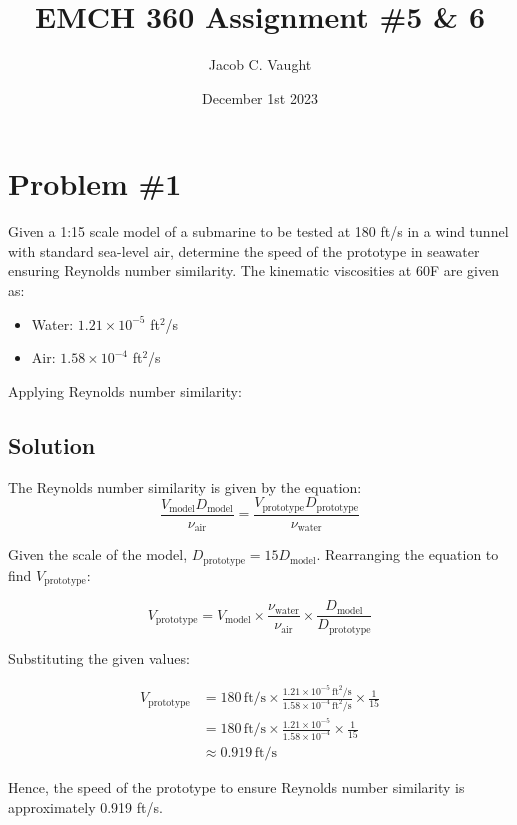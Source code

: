 \documentclass{article}
\title{EMCH 360 Assignment \#5 \& 6}
\author{Jacob C. Vaught}
\date{December 1st 2023}
\begin{document}
\maketitle
\section*{Problem \#1}
Given a 1:15 scale model of a submarine to be tested at 180 ft/s in a wind tunnel with standard sea-level air, determine the speed of the prototype in seawater ensuring Reynolds number similarity. The kinematic viscosities at 60\degree F are given as:

\begin{itemize}
    \item Water: $1.21 \times 10^{-5}$ ft\(^2\)/s
    \item Air: $1.58 \times 10^{-4}$ ft\(^2\)/s
\end{itemize}

Applying Reynolds number similarity:

\subsection*{Solution}
The Reynolds number similarity is given by the equation:
\[ \frac{V_{\text{model}} D_{\text{model}}}{\nu_{\text{air}}} = \frac{V_{\text{prototype}} D_{\text{prototype}}}{\nu_{\text{water}}} \]

Given the scale of the model, \( D_{\text{prototype}} = 15 D_{\text{model}} \). Rearranging the equation to find \( V_{\text{prototype}} \):

\[ V_{\text{prototype}} = V_{\text{model}} \times \frac{\nu_{\text{water}}}{\nu_{\text{air}}} \times \frac{D_{\text{model}}}{D_{\text{prototype}}} \]

Substituting the given values:

\begin{align*}
    V_{\text{prototype}} &= 180 \, \text{ft/s} \times \frac{1.21 \times 10^{-5} \, \text{ft}^2/\text{s}}{1.58 \times 10^{-4} \, \text{ft}^2/\text{s}} \times \frac{1}{15} \\
    &= 180 \, \text{ft/s} \times \frac{1.21 \times 10^{-5}}{1.58 \times 10^{-4}} \times \frac{1}{15} \\
    &\approx 0.919 \, \text{ft/s}
\end{align*}

Hence, the speed of the prototype to ensure Reynolds number similarity is approximately 0.919 ft/s.

\newpage
\end{document}
